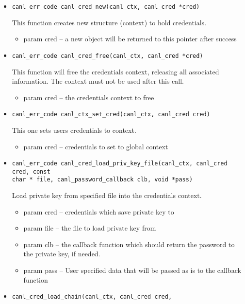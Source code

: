 \begin{itemize}
  \item \begin{verbatim}
canl_err_code canl_cred_new(canl_ctx, canl_cred *cred)\end{verbatim}
This function creates new structure (context) to hold credentials.
  \begin{itemize}
    \item param cred -- a new object will be returned to this pointer after
    success
  \end{itemize}
  \item \begin{verbatim}
canl_err_code canl_cred_free(canl_ctx, canl_cred *cred)\end{verbatim}
  This function will free the credentials context, releasing
  all associated information.  The context must not be used after this call.
  \begin{itemize}
    \item param cred -- the credentials context to free 
  \end{itemize}
  \item \begin{verbatim}
canl_err_code canl_ctx_set_cred(canl_ctx, canl_cred cred)\end{verbatim}
  This one sets users credentials to \CANL context.
  \begin{itemize}
    \item param cred -- credentials to set to global \CANL context
  \end{itemize}
  \item \begin{verbatim}
canl_err_code canl_cred_load_priv_key_file(canl_ctx, canl_cred cred, const 
char * file, canl_password_callback clb, void *pass)\end{verbatim}
  Load private key from specified file into the credentials context.
  \begin{itemize}
    \item param cred -- credentials which save private key to
    \item param file -- the file to load private key from
    \item param clb -- the callback function which should return
    the password to the private key, if needed.
    \item param pass -- User specified data that will be passed
    as is to the callback function
  \end{itemize}
  \item \verb'canl_cred_load_chain(canl_ctx, canl_cred cred,'

\end{itemize}
